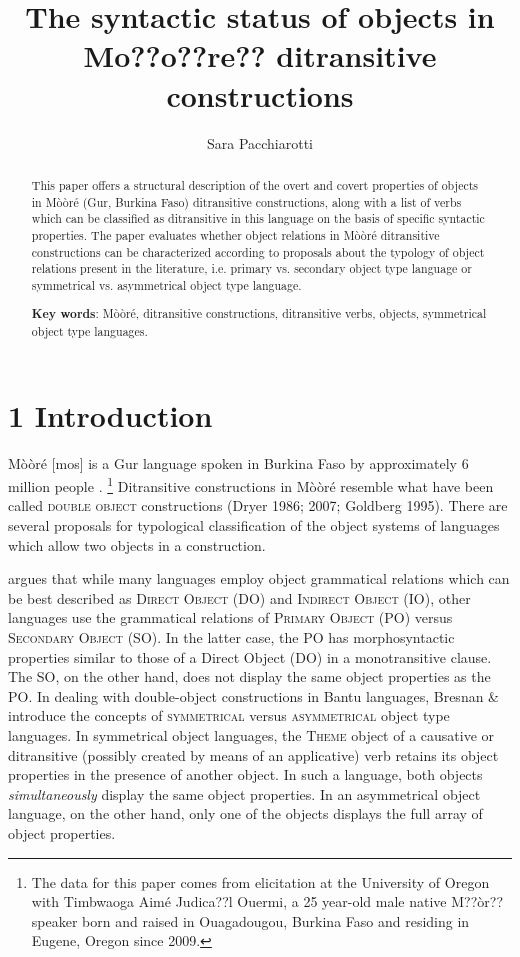 \documentclass[output=paper]{langsci/langscibook}
\title{The syntactic status of objects in {Mo??o??re??} ditransitive constructions}
\author{%
 Sara Pacchiarotti\affiliation{University of Oregon}
}
\begin{document}
\begin{abstract}
This paper offers a structural description of the overt and covert properties of objects in Mòòré (Gur, Burkina Faso) ditransitive constructions, along with a list of verbs which can be classified as ditransitive in this language on the basis of specific syntactic properties. The paper evaluates whether object relations in Mòòré ditransitive constructions can be characterized according to proposals about the typology of object relations present in the literature, i.e. primary vs. secondary object type language or symmetrical vs. asymmetrical object type language. 
\end{abstract}

\begin{abstract}
\textbf{Key words}: Mòòré, ditransitive constructions, ditransitive verbs, objects, symmetrical object type languages.  
\end{abstract}

\section[1 Introduction]{1 Introduction}

Mòòré [mos] is a Gur language spoken in Burkina Faso by approximately 6 million people \citep{LewisEtAl2016}.{ }\footnote{ The data for this paper comes from elicitation at the University of Oregon with Timbwaoga Aimé Judica??l Ouermi, a 25 year-old male native M??òr?? speaker born and raised in Ouagadougou, Burkina Faso and residing in Eugene, Oregon since 2009.}\textsuperscript{ } Ditransitive constructions in Mòòré resemble what have been called \textsc{double object} constructions (Dryer 1986; 2007; Goldberg 1995). There are several proposals for typological classification of the object systems of languages which allow two objects in a construction.

\citet{Dryer1986} argues that while many languages employ object grammatical relations which can be best described as \textsc{Direct Object} (DO) and \textsc{Indirect Object }(IO), other languages use the grammatical relations of \textsc{Primary Object} (PO) versus \textsc{Secondary Object} (SO). In the latter case, the PO has morphosyntactic properties similar to those of a Direct Object (DO) in a monotransitive clause. The SO, on the other hand, does not display the same object properties as the PO. In dealing with double-object constructions in Bantu languages, Bresnan \& \citet{Moshi1990} introduce the concepts of \textsc{symmetrical} versus \textsc{asymmetrical} object type languages. In symmetrical object languages, the \textsc{Theme} object of a causative or ditransitive (possibly created by means of an applicative) verb retains its object properties in the presence of another object. In such a language, both objects \textit{simultaneously }display the same object properties. In an asymmetrical object language, on the other hand, only one of the objects displays the full array of object properties. 
\end{document}
